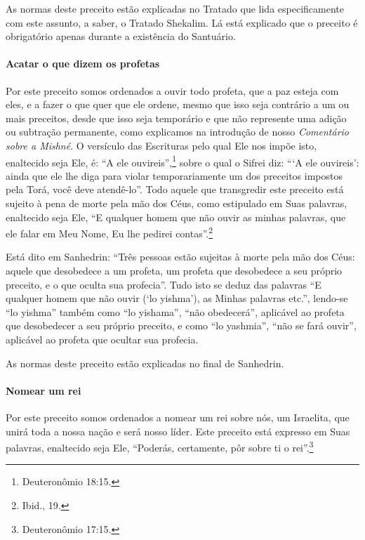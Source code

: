 As normas deste preceito estão explicadas no Tratado que lida
especificamente com este assunto, a saber, o Tratado Shekalim. Lá está
explicado que o preceito é obrigatório apenas durante a existência do
Santuário.

\paragraph{Acatar o que dizem os profetas}

Por este preceito somos ordenados a ouvir todo profeta, que a paz esteja
com eles, e a fazer o que quer que ele ordene, mesmo que isso seja contrário a um ou mais preceitos, desde que isso seja temporário e que não
represente uma adição ou subtração permanente, como explicamos na
introdução de nosso \emph{Comentário sobre a Mishné}. O versículo das
Escrituras pelo qual Ele nos impõe isto, enaltecido seja Ele, é: ``A ele
ouvireis'',\footnote{Deuteronômio 18:15.} sobre o qual o Sifrei diz: ```A ele
ouvireis': ainda que ele lhe diga para violar temporariamente um dos
preceitos impostos pela Torá, você deve atendê-lo''. Todo aquele que
transgredir este preceito está sujeito à pena de morte pela mão dos
Céus, como estipulado em Suas palavras, enaltecido seja Ele, ``E
qualquer homem que não ouvir as minhas palavras, que ele falar em Meu
Nome, Eu lhe pedirei contas''.\footnote{Ibid., 19.}

Está dito em Sanhedrin: ``Três pessoas estão sujeitas à morte pela mão
dos Céus: aquele que desobedece a um profeta, um profeta que desobedece
a seu próprio preceito, e o que oculta sua profecia''. Tudo isto se
deduz das palavras ``E qualquer homem que não ouvir (`lo yishma'), as
Minhas palavras etc.'', lendo-se ``lo yishma'' também como ``lo
yishama'', ``não obedecerá'', aplicável ao profeta que desobedecer a
seu próprio preceito, e como ``lo yashmia'', ``não se fará ouvir'',
aplicável ao profeta que ocultar sua profecia.

As normas deste preceito estão explicadas no final de Sanhedrin.

\paragraph{Nomear um rei}

Por este preceito somos ordenados a nomear um rei sobre nós, um
Israelita, que unirá toda a nossa nação e será nosso líder. Este
preceito está expresso em Suas palavras, enaltecido seja Ele,
``Poderás, certamente, pôr sobre ti o rei''.\footnote{Deuteronômio 17:15.}

